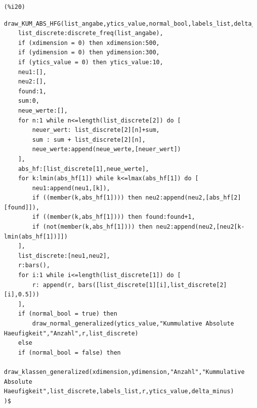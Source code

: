 \documentclass{article}
\begin{document}
\noindent
\begin{minipage}[t]{8ex}{\color{red}\bf
\begin{verbatim}
(%i20) 
\end{verbatim}}
\end{minipage}
\begin{minipage}[t]{\textwidth}{\color{blue}
\begin{verbatim}
draw_KUM_ABS_HFG(list_angabe,ytics_value,normal_bool,labels_list,delta_minus,xdimension,ydimension):=block(
    list_discrete:discrete_freq(list_angabe),
    if (xdimension = 0) then xdimension:500,
    if (ydimension = 0) then ydimension:300,
    if (ytics_value = 0) then ytics_value:10,
    neu1:[],
    neu2:[],
    found:1,
    sum:0,
    neue_werte:[],
    for n:1 while n<=length(list_discrete[2]) do [
        neuer_wert: list_discrete[2][n]+sum,
        sum : sum + list_discrete[2][n],
        neue_werte:append(neue_werte,[neuer_wert])
    ],
    abs_hf:[list_discrete[1],neue_werte],
    for k:lmin(abs_hf[1]) while k<=lmax(abs_hf[1]) do [
        neu1:append(neu1,[k]),
        if ((member(k,abs_hf[1]))) then neu2:append(neu2,[abs_hf[2][found]]),
        if ((member(k,abs_hf[1]))) then found:found+1,
        if (not(member(k,abs_hf[1]))) then neu2:append(neu2,[neu2[k-lmin(abs_hf[1])]])
    ],  
    list_discrete:[neu1,neu2],
    r:bars(),
    for i:1 while i<=length(list_discrete[1]) do [
        r: append(r, bars([list_discrete[1][i],list_discrete[2][i],0.5]))
    ],
    if (normal_bool = true) then
        draw_normal_generalized(ytics_value,"Kummulative Absolute Haeufigkeit","Anzahl",r,list_discrete)
    else
    if (normal_bool = false) then
      draw_klassen_generalized(xdimension,ydimension,"Anzahl","Kummulative Absolute Haeufigkeit",list_discrete,labels_list,r,ytics_value,delta_minus)
)$
\end{verbatim}}
\end{minipage}
\end{document}
